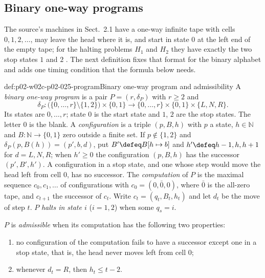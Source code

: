 \subsection{Binary one-way programs}
\label{sec:p02-w02c-p02-025-programs}

The source's machines in Sect.~2.1 have a one-way infinite tape with cells
\(0,1,2,\ldots\), may leave the head where it is, and start in state \(0\) at
the left end of the empty tape; for the halting problems \(H_1\) and \(H_2\)
they have exactly the two stop states \(1\) and \(2\)
\cite[Sect.~2.1.1, p.~20; Sect.~2.1.2, p.~34]{BorgerGradelGurevich1997}.  The
next definition fixes that format for the binary alphabet and adds one timing
condition that the formula below needs.

\begin{hbdefinition}{def:p02-w02c-p02-025-program}{Binary one-way program and admissibility}
A \emph{binary one-way program} is a pair \(P=(r,\delta_P)\) with \(r\geq2\) and
\[
 \delta_P:\bigl(\{0,\ldots,r\}\setminus\{1,2\}\bigr)\times\{0,1\}
 \longrightarrow\{0,\ldots,r\}\times\{0,1\}\times\{L,N,R\}.
\]
Its states are \(0,\ldots,r\); state \(0\) is the start state and \(1\), \(2\)
are the stop states.  The letter \(0\) is the blank.  A \emph{configuration} is
a triple \((p,B,h)\) with \(p\) a state, \(h\in\mathbb N\) and
\(B:\mathbb N\to\{0,1\}\) zero outside a finite set.  If \(p\notin\{1,2\}\) and
\(\delta_P(p,B(h))=(p',b,d)\), put \(B'\defeq B[h\mapsto b]\) and
\(h'\defeq h-1,h,h+1\) for \(d=L,N,R\); when \(h'\geq0\) the configuration
\((p,B,h)\) has the successor \((p',B',h')\).  A configuration in a stop state,
and one whose step would move the head left from cell \(0\), has no
successor.  The \emph{computation} of \(P\) is the maximal sequence
\(c_0,c_1,\ldots\) of configurations with \(c_0=(0,\bar0,0)\), where
\(\bar0\) is the all-zero tape, and \(c_{t+1}\) the successor of \(c_t\).  Write
\(c_t=(q_t,B_t,h_t)\) and let \(d_t\) be the move of step \(t\).  \(P\)
\emph{halts in state \(i\)} (\(i=1,2\)) when some \(q_s=i\).

\(P\) is \emph{admissible} when its computation has the following two
properties:
\begin{enumerate}
\item[(N1)] no configuration of the computation fails to have a successor
  except one in a stop state, that is, the head never moves left from cell
  \(0\);
\item[(N2)] whenever \(d_t=R\), then \(h_t\leq t-2\).
\end{enumerate}
\end{hbdefinition}

